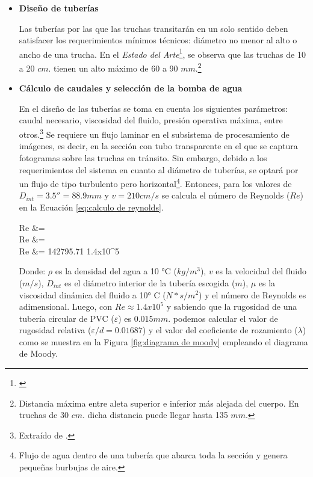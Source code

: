 \begin{itemize}
	
	\item \textbf{Diseño de tuberías}
	
	Las tuberías por las que las truchas transitarán en un solo sentido deben satisfacer los requerimientos mínimos técnicos: diámetro no menor al alto o ancho de una trucha. En el \textit{Estado del Arte}\footnote{\cite{DiazVergara2020}}, se observa que las truchas de 10 a 20 $cm.$ tienen un alto máximo de 60 a 90 $mm.$\footnote{Distancia máxima entre aleta superior e inferior más alejada del cuerpo. En truchas de 30 $cm.$ dicha distancia puede llegar hasta 135 $mm.$} 
	
	\item \textbf{Cálculo de caudales y selección de la bomba de agua} 
	
	En el diseño de las tuberías se toma en cuenta los siguientes parámetros: caudal necesario, viscosidad del fluido, presión operativa máxima, entre otros.\footnote{Extraído de \cite{INTECHGmbH2020}.} Se requiere un flujo laminar en el subsistema de procesamiento de imágenes, es decir, en la sección con tubo transparente en el que se captura fotogramas sobre las truchas en tránsito. Sin embargo, debido a los requerimientos del sistema en cuanto al diámetro de tuberías, se optará por un flujo de tipo turbulento pero horizontal\footnote{Flujo de agua dentro de una tubería que abarca toda la sección y genera pequeñas burbujas de aire.}. Entonces, para los valores de $D_{int}=3.5''=88.9 mm$ y $v=210 cm/s$ se calcula el número de Reynolds ($Re$) en la Ecuación \ref{eq:calculo de reynolds}.
	
	\begin{myequation}\label{eq:calculo de reynolds}
		\begin{split}
			Re &=  \\
			Re &=  \\
			Re &= 142795.71 \approx 1.4x10^5
		\end{split}		
	\end{myequation}

	Donde: $\rho$ es la densidad del agua a 10 °C ($kg/m^3$), $v$ es la velocidad del fluido ($m/s$), $D_{int}$ es el diámetro interior de la tubería escogida ($m$), $\mu$ es la viscosidad dinámica del fluido a 10° C ($N*s/m^2$) y el número de Reynolds es adimensional. Luego, con $Re\approx1.4x10^5$ y sabiendo que la rugosidad de una tubería circular de PVC ($\varepsilon$) es $0.015 mm.$ podemos calcular el valor de rugosidad relativa ($\varepsilon/d=0.01687$) y el valor del coeficiente de rozamiento ($\lambda$) como se muestra en la Figura \ref{fig:diagrama de moody} empleando el diagrama de Moody.
	

\end{itemize}

